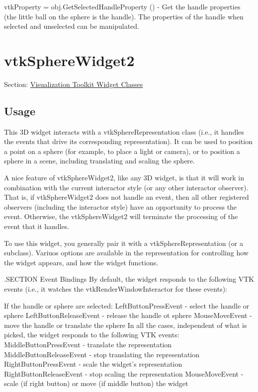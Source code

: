 \begin{DoxyItemize}
\item {\ttfamily vtk\-Property = obj.\-Get\-Selected\-Handle\-Property ()} -\/ Get the handle properties (the little ball on the sphere is the handle). The properties of the handle when selected and unselected can be manipulated.  
\end{DoxyItemize}\hypertarget{vtkwidgets_vtkspherewidget2}{}\section{vtk\-Sphere\-Widget2}\label{vtkwidgets_vtkspherewidget2}
Section\-: \hyperlink{sec_vtkwidgets}{Visualization Toolkit Widget Classes} \hypertarget{vtkwidgets_vtkxyplotwidget_Usage}{}\subsection{Usage}\label{vtkwidgets_vtkxyplotwidget_Usage}
This 3\-D widget interacts with a vtk\-Sphere\-Representation class (i.\-e., it handles the events that drive its corresponding representation). It can be used to position a point on a sphere (for example, to place a light or camera), or to position a sphere in a scene, including translating and scaling the sphere.

A nice feature of vtk\-Sphere\-Widget2, like any 3\-D widget, is that it will work in combination with the current interactor style (or any other interactor observer). That is, if vtk\-Sphere\-Widget2 does not handle an event, then all other registered observers (including the interactor style) have an opportunity to process the event. Otherwise, the vtk\-Sphere\-Widget2 will terminate the processing of the event that it handles.

To use this widget, you generally pair it with a vtk\-Sphere\-Representation (or a subclass). Variuos options are available in the representation for controlling how the widget appears, and how the widget functions.

.S\-E\-C\-T\-I\-O\-N Event Bindings By default, the widget responds to the following V\-T\-K events (i.\-e., it watches the vtk\-Render\-Window\-Interactor for these events)\-: 
\begin{DoxyPre}
 If the handle or sphere are selected:
   LeftButtonPressEvent - select the handle or sphere
   LeftButtonReleaseEvent - release the handle ot sphere
   MouseMoveEvent - move the handle or translate the sphere
 In all the cases, independent of what is picked, the widget responds to the 
 following VTK events:
   MiddleButtonPressEvent - translate the representation
   MiddleButtonReleaseEvent - stop translating the representation
   RightButtonPressEvent - scale the widget's representation
   RightButtonReleaseEvent - stop scaling the representation
   MouseMoveEvent - scale (if right button) or move (if middle button) the widget
 \end{DoxyPre}


